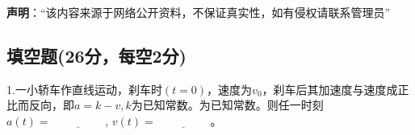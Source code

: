 
\textbf{声明}：“该内容来源于网络公开资料，不保证真实性，如有侵权请联系管理员”

\subsection{填空题(26分，每空2分)}
1.一小轿车作直线运动，刹车时$(t=0)$，速度为$v_0$，刹车后其加速度与速度成正比而反向，即$a=k-v,k$为已知常数。为已知常数。则任一时刻 $a(t) = \underline{\hspace{2cm}}$, $v(t) = \underline{\hspace{2cm}}$。